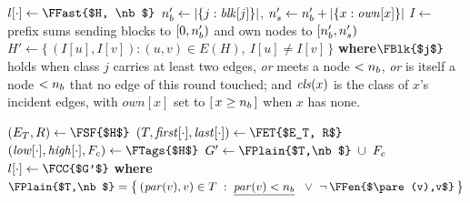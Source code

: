 \begin{algorithm}[t]
\caption{\textsc{compress-graph} \textsc{Algorithm}}\label{alg:comp}
$l[\cdot] \gets \FFast{$H, \nb$}$ 
$n_b' \gets |\{j : \mathit{blk}[j]\}|$, \quad
  $n_s' \gets n_b' + |\{x : \mathit{own}[x]\}|$\;
$I \gets$ prefix sums sending blocks to $[0,n_b')$ and own nodes to
  $[n_b',n_s')$\;
$H' \gets \{\,(I[u],I[v]) : (u,v) \in E(H),\ I[u] \neq I[v]\,\}$\;
\BlankLine
\textbf{where}\quad $\FBlk{$j$}$ holds when class $j$ carries at least two
edges, \emph{or} meets a node $<n_b$, \emph{or} is itself a node $<n_b$ that no
edge of this round touched; and $\mathit{cls}(x)$ is the class of $x$'s incident edges,
with $\mathit{own}[x]$ set to $[\,x \ge n_b\,]$ when $x$ has none.
\end{algorithm}

\begin{algorithm}[t]
\caption{\textsc{fast-bcc}$^{+}$ \textsc{Algorithm}}\label{alg:fast}
$(E_T, R) \gets \FSF{$H$}$ 
$(T,\mathit{first}[\cdot],\mathit{last}[\cdot]) \gets \FET{$E_T, R$}$\;
$(\mathit{low}[\cdot],\mathit{high}[\cdot],F_c) \gets \FTags{$H$}$\;
$G' \gets \FPlain{$T,\nb$}\; \cup\; F_c$ 
$l[\cdot] \gets \FCC{$G'$}$ 
\BlankLine
\textbf{where}\quad
$\FPlain{$T,\nb$} = \bigl\{\,(\pare(v),v) \in T \;:\;
   \underline{\pare(v) < \nb}\;\ \vee\ \neg\,\FFen{$\pare(v),v$}\,\bigr\}$
\end{algorithm}


